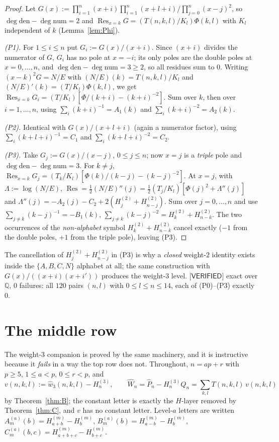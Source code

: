 \documentclass[11pt,reqno]{amsart}
\theoremstyle{plain}
\theoremstyle{definition}
\theoremstyle{remark}
\numberwithin{equation}{section}
\newcommand{\QQ}{\mathbb{Q}}
\newcommand{\Res}{\operatorname{Res}}
\newcommand{\wthree}{\hat w_3}
\newcommand{\VERIFIED}{\textsf{[VERIFIED]}}
\begin{document}
\begin{proof}
Let $G(x):=\prod_{i=1}^n(x+i)\prod_{i=1}^n(x+l+i)\big/\prod_{j=0}^n(x-j)^2$, so
$\deg\mathrm{den}-\deg\mathrm{num}=2$ and $\Res_{x=k}G=(T(n,k,l)/K_l)\Phi(k,l)$ with $K_l$
independent of $k$ (Lemma~\ref{lem:Phi}).

\emph{(P1).} For $1\le i\le n$ put $G_i:=G(x)/(x+i)$. Since $(x+i)$ divides the numerator of
$G$, $G_i$ has no pole at $x=-i$; its only poles are the double poles at $x=0,\dots,n$, and
$\deg\mathrm{den}-\deg\mathrm{num}=3\ge2$, so all residues sum to $0$. Writing $(x-k)^2G=N/E$
with $(N/E)(k)=T(n,k,l)/K_l$ and $(N/E)'(k)=(T/K_l)\Phi(k,l)$, we get
$\Res_{x=k}G_i=(T/K_l)[\Phi/(k+i)-(k+i)^{-2}]$. Sum over $k$, then over $i=1,\dots,n$, using
$\sum_i(k+i)^{-1}=A_1(k)$ and $\sum_i(k+i)^{-2}=A_2(k)$.

\emph{(P2).} Identical with $G(x)/(x+l+i)$ (again a numerator factor), using
$\sum_i(k+l+i)^{-1}=C_1$ and $\sum_i(k+l+i)^{-2}=C_2$.

\emph{(P3).} Take $G_j:=G(x)/(x-j)$, $0\le j\le n$; now $x=j$ is a \emph{triple} pole and
$\deg\mathrm{den}-\deg\mathrm{num}=3$. For $k\ne j$,
$\Res_{x=k}G_j=(T_k/K_l)[\Phi(k)/(k-j)-(k-j)^{-2}]$. At $x=j$, with $\Lambda:=\log(N/E)$,
$\Res=\tfrac12(N/E)''(j)=\tfrac12(T_j/K_l)[\Phi(j)^2+\Lambda''(j)]$ and
$\Lambda''(j)=-A_2(j)-C_2+2(H^{(2)}_j+H^{(2)}_{n-j})$. Sum over $j=0,\dots,n$ and use
$\sum_{j\ne k}(k-j)^{-1}=-B_1(k)$, $\sum_{j\ne k}(k-j)^{-2}=H^{(2)}_k+H^{(2)}_{n-k}$. The two
occurrences of the \emph{non-alphabet} symbol $H^{(2)}_k+H^{(2)}_{n-k}$ cancel exactly ($-1$
from the double poles, $+1$ from the triple pole), leaving (P3).
\end{proof}

The cancellation of $H^{(2)}_j+H^{(2)}_{n-j}$ in (P3) is why a \emph{closed} weight-$2$ identity
exists inside the $\{A,B,C,N\}$ alphabet at all; the same construction with
$G(x)/((x+i)(x+i'))$ produces the weight-$3$ level. $\VERIFIED$ exact over $\QQ$, $0$ failures:
all $120$ pairs $(n,l)$ with $0\le l\le n\le14$, each of (P0)--(P3) exactly $0$.

\section{The middle row}\label{sec:middle}

The weight-$3$ companion is proved by the same machinery, and it is instructive because it
\emph{fails} in a way the top row does not. Throughout, $n=ap+r$ with $p\ge5$, $1\le a<p$,
$0\le r<p$, and
\[
v(n,k,l):=\wthree(n,k,l)-H^{(3)}_n,\qquad
\hat W_n=\hat P_n-H^{(3)}_nQ_n=\sum_{k,l}T(n,k,l)\,v(n,k,l)
\]
by Theorem~\ref{thm:B}; the constant letter is exactly the $H$-layer removed by
Theorem~\ref{thm:C}, and $v$ has no constant letter. Level-$a$ letters are written
$A^{(a)}_m(b)=H^{(m)}_{a+b}-H^{(m)}_b$, $B^{(a)}_m(b)=H^{(m)}_{a-b}-H^{(m)}_b$,
$C^{(a)}_m(b,c)=H^{(m)}_{a+b+c}-H^{(m)}_{b+c}$.
\end{document}
